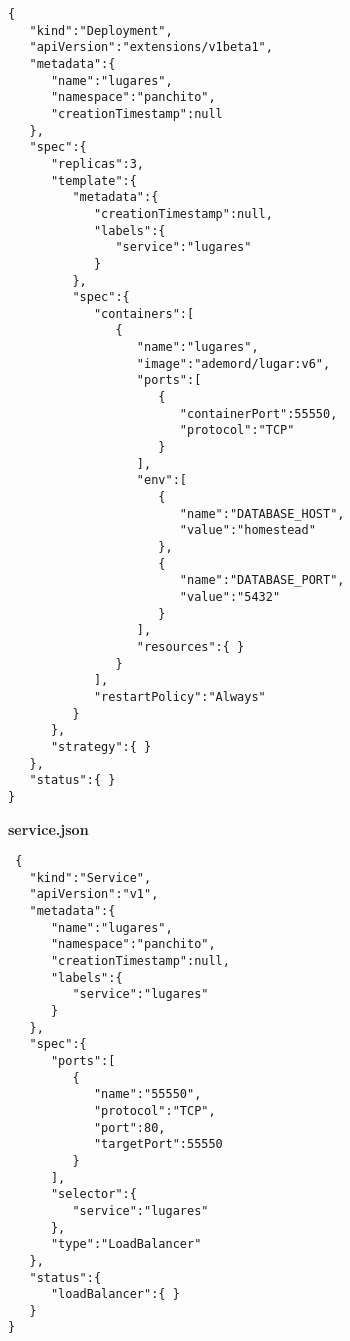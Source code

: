 \begin{mdframed}[linecolor=black, topline=true, bottomline=true,
  leftline=false, rightline=false, backgroundcolor=LightGray,userdefinedwidth=\textwidth]
  \begin{verbatim}
{  
   "kind":"Deployment",
   "apiVersion":"extensions/v1beta1",
   "metadata":{  
      "name":"lugares",
      "namespace":"panchito",
      "creationTimestamp":null
   },
   "spec":{  
      "replicas":3,
      "template":{  
         "metadata":{  
            "creationTimestamp":null,
            "labels":{  
               "service":"lugares"
            }
         },
         "spec":{  
            "containers":[  
               {  
                  "name":"lugares",
                  "image":"ademord/lugar:v6",
                  "ports":[  
                     {  
                        "containerPort":55550,
                        "protocol":"TCP"
                     }
                  ],
                  "env":[  
                     {  
                        "name":"DATABASE_HOST",
                        "value":"homestead"
                     },
                     {  
                        "name":"DATABASE_PORT",
                        "value":"5432"
                     }
                  ],
                  "resources":{ }
               }
            ],
            "restartPolicy":"Always"
         }
      },
      "strategy":{ }
   },
   "status":{ }
}
\end{verbatim}
\end{mdframed}

\pagebreak
{ \sffamily \textbf{service.json} }
\begin{mdframed}[linecolor=black, topline=true, bottomline=true,
  leftline=false, rightline=false, backgroundcolor=LightGray,userdefinedwidth=\textwidth]
  \begin{verbatim}
 {  
   "kind":"Service",
   "apiVersion":"v1",
   "metadata":{  
      "name":"lugares",
      "namespace":"panchito",
      "creationTimestamp":null,
      "labels":{  
         "service":"lugares"
      }
   },
   "spec":{  
      "ports":[  
         {  
            "name":"55550",
            "protocol":"TCP",
            "port":80,
            "targetPort":55550
         }
      ],
      "selector":{  
         "service":"lugares"
      },
      "type":"LoadBalancer"
   },
   "status":{  
      "loadBalancer":{ }
   }
}
\end{verbatim}
\end{mdframed}

